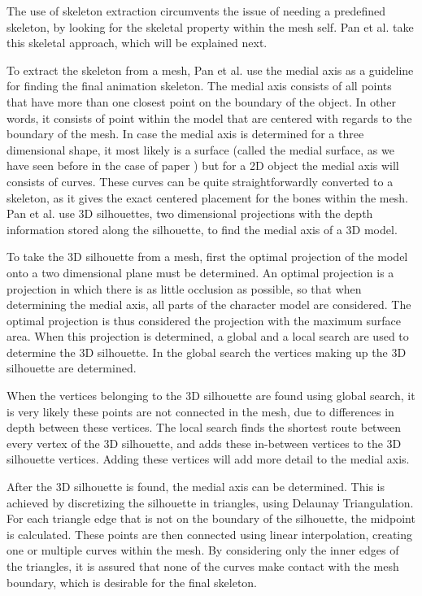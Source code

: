 \documentclass{article}
\begin{document}
The use of skeleton extraction circumvents the issue of needing a predefined
skeleton, by looking for the skeletal property within the mesh self. Pan et al.
\citep{paper2} take this skeletal approach, which will be explained next.

To extract the skeleton from a mesh, Pan et al. use the medial axis as a
guideline for finding the final animation skeleton. The medial axis consists of all points that have more than one
closest point on the boundary of the object. In other words, it consists of
point within the model that are centered with regards to the boundary of the
mesh. In case the medial axis is determined for a three dimensional shape, it most likely
is a surface (called the medial surface, as we have seen before in the case of
paper \citep{paper1}) but for a 2D object the medial axis will consists of
curves. These curves can be quite straightforwardly converted to a skeleton, as
it gives the exact centered placement for the bones within the mesh. Pan et al.
use 3D silhouettes, two dimensional projections with the depth information stored along
the silhouette, to find the medial axis of a 3D model.

To take the 3D silhouette from a mesh, first the optimal projection of the model
onto a two dimensional plane must be determined. An optimal projection is a
projection in which there is as little occlusion as possible, so that when
determining the medial axis, all parts of the character model are considered.
The optimal projection is thus considered the projection with the maximum
surface area. When this projection is determined, a global and a local search
are used to determine the 3D silhouette. In the global search the vertices
making up the 3D silhouette are determined. 

When the vertices belonging to the 3D silhouette are found using global search,
it is very likely these points are not connected in the mesh, due to
differences in depth between these vertices. The local search finds the shortest
route between every vertex of the 3D silhouette, and adds these in-between
vertices to the 3D silhouette vertices. Adding these vertices will add more
detail to the medial axis. %

After the 3D silhouette is found, the medial axis can be determined. This is
achieved by discretizing the silhouette in triangles, using Delaunay
Triangulation. For each triangle edge that is not on the boundary of the
silhouette, the midpoint is calculated. These points are then connected using
linear interpolation, creating one or multiple curves within the mesh. By
considering only the inner edges of the triangles, it is assured that none of
the curves make contact with the mesh boundary, which is desirable for the final
skeleton.
\end{document}
